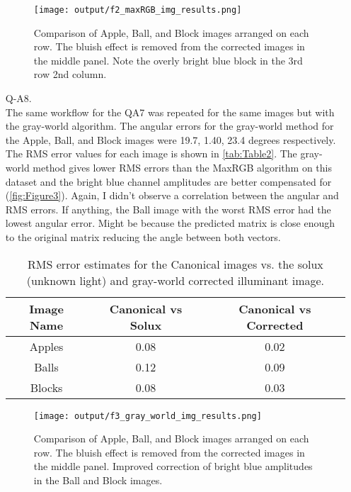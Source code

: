 \documentclass[12pt]{report}
\begin{document}
\begin{enumerate}
    \begin{figure}[H]
        \centering
        \texttt{[image: output/f2\_maxRGB\_img\_results.png]}
        \caption{Comparison of Apple, Ball, and Block images arranged on each row. The bluish effect is removed from the corrected images in the middle panel. 
        Note the overly bright blue block in the 3rd row 2nd column.}
        \label{fig:Figure2}
    \end{figure}

    \FloatBarrier 

    \item[Q-A8.]
    \ \\
    The same workflow for the QA7 was repeated for the same images but with the gray-world algorithm. The angular errors for the gray-world method for the Apple, Ball, 
    and Block images were 19.7, 1.40, 23.4 degrees respectively. The RMS error values for each image is shown in \autoref{tab:Table2}. The gray-world method gives 
    lower RMS errors than the MaxRGB algorithm on this dataset and the bright blue channel amplitudes are better compensated for (\autoref{fig:Figure3}). Again, I didn't 
    observe a correlation between the angular and RMS errors. If anything, the Ball image with the worst RMS error had the lowest angular error. Might be because the 
    predicted matrix is close enough to the original matrix reducing the angle between both vectors.

    \begin{table}[h!]
    \begin{center}
    \begin{tabular}{ | c | c | c | } 
        \hline
        Image Name & Canonical vs Solux & Canonical vs Corrected \\ 
        \hline \hline
        Apples & 0.08 & 0.02 \\ 
        Balls  & 0.12 & 0.09 \\ 
        Blocks & 0.08 & 0.03 \\
        \hline
    \end{tabular}
    \caption{RMS error estimates for the Canonical images vs. the solux (unknown light) and gray-world corrected illuminant image.}
    \label{tab:Table2}
    \end{center}
    \end{table}

    \begin{figure}[H]
        \centering
        \texttt{[image: output/f3\_gray\_world\_img\_results.png]}
        \caption{Comparison of Apple, Ball, and Block images arranged on each row. The bluish effect is removed from the corrected images in the middle panel. 
        Improved correction of bright blue amplitudes in the Ball and Block images.}
        \label{fig:Figure3}
    \end{figure}


\end{enumerate}
\end{document}
